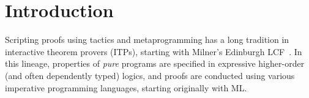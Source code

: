 \documentclass[runningheads]{llncs}
\newcommand\fstar{F$^\star$\xspace}
\newcommand{\comm}[3]{\ifcheckpagebudget\else\ifdraft{{\color{#1}[#2: #3]}}\fi\fi}
\newcommand{\ch}[1]{\comm{teal}{CH}{#1}}
\newcommand{\guido}[1]{\comm{blue}{Guido}{#1}}
\begin{document}

%
%


\section{Introduction}


Scripting proofs using tactics and metaprogramming has a long
tradition in interactive theorem provers (ITPs), starting with Milner's
Edinburgh LCF~\cite{gordon-edinburghLCF:1979}.  In this lineage,
properties of \emph{pure} programs are specified
in expressive higher-order (and often dependently typed) logics,
and proofs are conducted using various imperative programming
languages, starting originally with ML.
\end{document}
